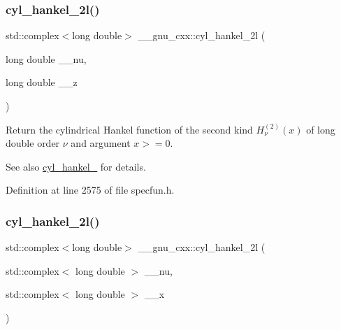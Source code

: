 \subsubsection{\texorpdfstring{cyl\+\_\+hankel\+\_\+2l()}{cyl\_hankel\_2l()}\hspace{0.1cm}{\footnotesize\ttfamily [1/2]}}
{\footnotesize\ttfamily std\+::complex$<$long double$>$ \+\_\+\+\_\+gnu\+\_\+cxx\+::cyl\+\_\+hankel\+\_\+2l (\begin{DoxyParamCaption}\item[{long double}]{\+\_\+\+\_\+nu,  }\item[{long double}]{\+\_\+\+\_\+z }\end{DoxyParamCaption})\hspace{0.3cm}{\ttfamily [inline]}}

Return the cylindrical Hankel function of the second kind $ H^{(2)}_\nu(x) $ of {\ttfamily long double} order $ \nu $ and argument $ x >= 0 $.

\begin{DoxySeeAlso}{See also}
\hyperlink{group__gnu__math__spec__func_ga7ebc71dd48ac97255d72f5f5f43dfd8e}{cyl\+\_\+hankel\+\_} for details. 
\end{DoxySeeAlso}


Definition at line 2575 of file specfun.\+h.

\mbox{\label{group__gnu__math__spec__func_ga1ac6434925254bd02e108f5a4e52b34d}} 
\subsubsection{\texorpdfstring{cyl\+\_\+hankel\+\_\+2l()}{cyl\_hankel\_2l()}\hspace{0.1cm}{\footnotesize\ttfamily [2/2]}}
{\footnotesize\ttfamily std\+::complex$<$long double$>$ \+\_\+\+\_\+gnu\+\_\+cxx\+::cyl\+\_\+hankel\+\_\+2l (\begin{DoxyParamCaption}\item[{std\+::complex$<$ long double $>$}]{\+\_\+\+\_\+nu,  }\item[{std\+::complex$<$ long double $>$}]{\+\_\+\+\_\+x }\end{DoxyParamCaption})\hspace{0.3cm}{\ttfamily [inline]}}

